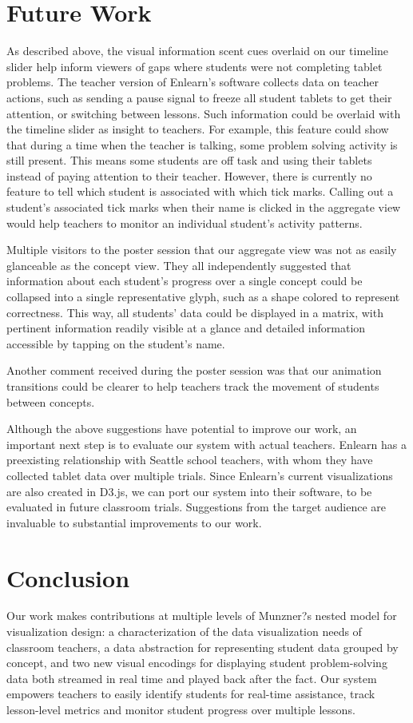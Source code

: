 \documentclass{sigchi}
\begin{document}
\section{Future Work}
As described above, the visual information scent cues overlaid on our timeline slider help inform viewers of gaps where students were not completing tablet problems. The teacher version of Enlearn's software collects data on teacher actions, such as sending a pause signal to freeze all student tablets to get their attention, or switching between lessons. Such information could be overlaid with the timeline slider as insight to teachers. For example, this feature could show that during a time when the teacher is talking, some problem solving activity is still present. This means some students  are off task and using their tablets instead of paying attention to their teacher. However, there is currently no feature to tell which student is associated with which tick marks. Calling out a student's associated tick marks when their name is clicked in the aggregate view would help teachers to monitor an individual student's activity patterns.

Multiple visitors to the poster session that our aggregate view was not as easily glanceable as the concept view. They all independently suggested that information about each student's progress over a single concept could be collapsed into a single representative glyph, such as a shape colored to represent correctness. This way, all students' data could be displayed in a matrix, with pertinent information readily visible at a glance and detailed information accessible by tapping on the student's name. 

Another comment received during the poster session was that our animation transitions could be clearer to help teachers track the movement of students between concepts.

Although the above suggestions have potential to improve our work, an important next step is to evaluate our system with actual teachers. Enlearn has a preexisting relationship with Seattle school teachers, with whom they have collected tablet data over multiple trials. Since Enlearn's current visualizations are also created in D3.js, we can port our system into their software, to be evaluated in future classroom trials. Suggestions from the target audience are invaluable to substantial improvements to our work.

\section{Conclusion}
Our work makes contributions at multiple levels of Munzner?s nested model for visualization design: a characterization of the data visualization needs of classroom teachers, a data abstraction for representing student data grouped by concept, and two new visual encodings for displaying student problem-solving data both streamed in real time and played back after the fact. Our system empowers teachers to easily identify students for real-time assistance, track lesson-level metrics and monitor student progress over multiple lessons.
\end{document}
